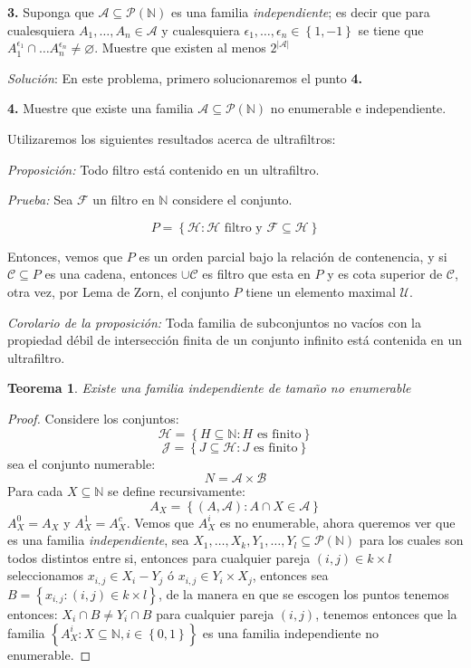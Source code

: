 \documentclass[11pt,a4paper,draft]{article}
\newtheorem{theorem}{Teorema}
\newcommand{\set}[1]{\left\lbrace #1 \right\rbrace}
\begin{document}
\singlespacing

\textbf{3.} Suponga que $ \mathcal{A} \subseteq \mathcal{P}(\mathbb{N}) $ es una familia \emph{independiente}; es decir que para cualesquiera $ A_1,\ldots,A_n  \in \mathcal{A}$ y cualesquiera $ \epsilon_1, \ldots, \epsilon_n \in \set{1,-1} $ se tiene que $ A_1^{\epsilon_1} \cap \ldots A_n^{\epsilon_n} \neq \varnothing $. Muestre que existen al menos $ 2^{\left| \mathcal{A} \right|} $

\textit{Solución}: En este problema, primero solucionaremos el punto \textbf{4.} 

\textbf{4.} Muestre que existe una familia $ \mathcal{A} \subseteq \mathcal{P}(\mathbb{N}) $ no enumerable e independiente.



Utilizaremos los siguientes resultados acerca de ultrafiltros:

\textit{Proposición:} Todo filtro está contenido en un ultrafiltro.

\textit{Prueba:} Sea $ \mathcal{F} $ un filtro en $ \mathbb{N} $ considere el conjunto.

\[ P = \set{\mathcal{H}: \mathcal{H} \textrm{ filtro y } \mathcal{F}\subseteq \mathcal{H}} \]

Entonces, vemos que $ P $ es un orden parcial bajo la relación de contenencia, y si $ \mathcal{C} \subseteq P $ es una cadena, entonces $ \cup \mathcal{C} $ es filtro que esta en $ P $ y es cota superior de $ \mathcal{C} $, otra vez, por Lema de Zorn, el conjunto $ P $ tiene un elemento maximal $ \mathcal{U} $.

\textit{Corolario de la proposición:} Toda familia de subconjuntos no vacíos con la propiedad débil de intersección finita de un conjunto infinito está contenida en un ultrafiltro.

\begin{theorem}
	Existe una familia independiente de tamaño no enumerable
\end{theorem}

\begin{proof}
	Considere los conjuntos:
	\[ \mathcal{H} = \set{H \subseteq \mathbb{N} : H \textrm{ es finito}} \]
	\[ \mathcal{J} = \set{J \subseteq \mathcal{H}: J \textrm{ es finito}} \]
	sea el conjunto numerable:
	\[ N = \mathcal{A} \times \mathcal{B} \]
	Para cada $ X \subseteq \mathbb{N} $ se define recursivamente:
	\[ A_X = \set{(A,\mathcal{A}): A \cap X \in \mathcal{A}}  \]
	$ A_X^0 = A_X $ y $ A_X^1 = A_X^c $. Vemos que $ A_X^i $ es no enumerable, ahora queremos ver que es una familia \emph{independiente}, sea $  X_1, \ldots, X_k,Y_1,\ldots,Y_l \subseteq \mathcal{P}(\mathbb{N})$ para los cuales son todos distintos entre si, entonces para cualquier pareja $ (i,j) \in k \times l $ seleccionamos $ x_{i,j} \in X_i - Y_j $ ó $ x_{i,j} \in Y_i \times X_j $, entonces sea $ B = \set{x_{i,j} : (i,j) \in k \times l} $, de la manera en que se escogen los puntos tenemos entonces: $ X_i \cap B \neq Y_i \cap B $ para cualquier pareja $ (i,j) $, tenemos entonces que la familia $ \set{A_X^i: X \subseteq \mathbb{N}, i \in \set{0,1}} $ es una familia independiente no enumerable.
	
\end{proof}
\end{document}
